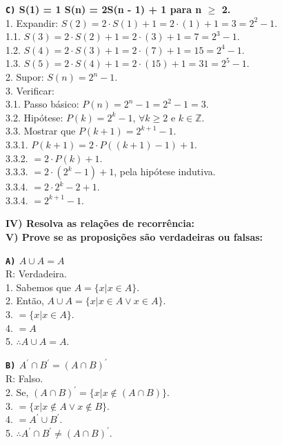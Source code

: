 \documentclass[12pt, a4paper]{article}
\newcommand{\Z}{\mathbb{Z}}
\newcommand\tab[1][1cm]{\hspace*{#1}}
\begin{document}
\begin{flushleft}
\vskip10mm

\textbf{\textbf{\texttt{C)}} S(1) = 1 \tab S(n) = 2S(n - 1) + 1 para n $\geq$ 2.\\}
\textsf{1. Expandir: $S(2) = 2 \cdot S(1) + 1 = 2 \cdot (1) + 1 = 3 = 2^2-1$. 
\\ \tab 1.1. \tab[0.37cm]  $S(3) = 2 \cdot S(2) + 1 = 2 \cdot (3) + 1 = 7 = 2^3-1$.
\\ \tab 1.2. \tab[0.37cm]  $S(4) = 2 \cdot S(3) + 1 = 2 \cdot (7) + 1 = 15 = 2^4-1$.
\\ \tab 1.3. \tab[0.37cm]  $S(5) = 2 \cdot S(4) + 1 = 2 \cdot (15) + 1 = 31 = 2^5-1$.
\\2. Supor: $S(n) = 2^n-1$.
\\3. Verificar: 
\\ \tab 3.1. Passo básico: $P(n) = 2^n-1 = 2^2-1 = 3$.
\\ \tab 3.2. Hipótese: $P(k) = 2^k-1$, $ \forall k \geq 2$ e $k \in \Z$.
\\ \tab 3.3. Mostrar que $P(k+1) = \boxed{ 2^{k+1} - 1 }$.
\\ \tab \tab 3.3.1. $P(k+1) = 2 \cdot P((k+1)-1) + 1$.
\\ \tab \tab 3.3.2. \tab \tab[0.6cm] $= 2 \cdot P(k) + 1$.
\\ \tab \tab 3.3.3. \tab \tab[0.6cm] $= 2 \cdot (2^k-1) + 1$, pela hipótese indutiva.
\\ \tab \tab 3.3.4. \tab \tab[0.6cm] $= 2 \cdot 2^k -2 + 1$.
\\ \tab \tab 3.3.4. \tab \tab[0.6cm] $= \boxed{2^{k+1} - 1}$.}


\pagebreak
\textbf{IV) Resolva as relações de recorrência: \\}
\textbf{V) Prove se as proposições são verdadeiras ou falsas: \\}

\vskip5mm

\textbf{\textbf{\texttt{A)}} $A\cup  A = A $ \\}
\textsf{R: Verdadeira.
\\1. Sabemos que $ A = \{ x | x \in A \} $. 
\\2. Então, $A \cup A = \{x|x \in A \lor x \in A \} $.
\\3. \tab \tab \tab[0.35cm] $= \{x | x \in A\}$.
\\4. \tab \tab \tab[0.35cm] $= A $
\\5. \tab \tab \tab[0.35cm] $\therefore A \cup A = A $.}

\vskip10mm

\textbf{\textbf{\texttt{B)}} $A^{'}\cap  B^{'} = (A \cap B)^{'} $ \\}
\textsf{R: Falso.
\\2. Se, $(A \cap B)^{'} = \{x|x \notin (A \cap B)\} $.
\\3. \tab \tab[1.20cm] $= \{ x | x \notin A \lor x \notin B \}$.
\\4. \tab \tab[1.20cm] $= A^{'} \cup B^{'}$.
\\5. \tab \tab[1.20cm] $ \therefore A^{'} \cap B^{'} \neq (A \cap B)^{'}  $.}


\end{flushleft}
\end{document}
